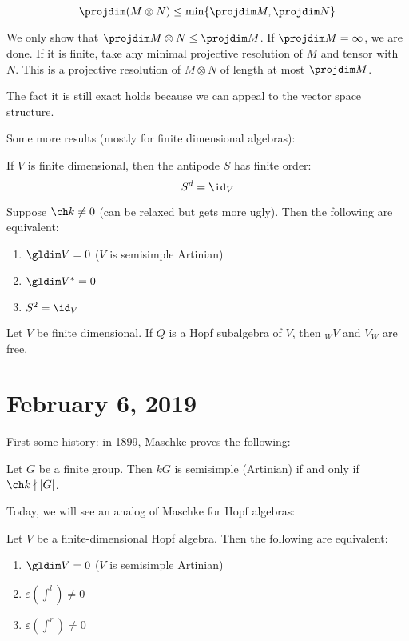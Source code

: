 \documentclass[12pt]{article}
\begin{document}
\begin{lem}\label{lem-tensorproj}
	\[\projdim(M\otimes N)\le \min\{\projdim M,\projdim N\}\]
\end{lem}
\begin{prf}
	We only show that $\projdim M\otimes N\le \projdim M$. If $\projdim M=\infty$, we are done.
	If it is finite, take any minimal projective resolution of $M$ and tensor with $N$. This is a projective 
	resolution of $M\otimes N$ of length at most $\projdim M$. 
\end{prf}
\begin{rmk}
	The fact it is still exact holds because we can appeal to the vector space structure.
\end{rmk}

\brk

Some more results (mostly for finite dimensional algebras):
\begin{thm}[Radford `75]
	If $V$ is finite dimensional, then the antipode $S$ has finite order:
	\[S^d=\id_V\]
\end{thm}
\begin{thm}\label{thm-LR88}
	Suppose $\ch k\ne 0$ (can be relaxed but gets more ugly). Then the following are equivalent:
	\begin{enumerate}
		\item $\gldim V=0$ ($V$ is semisimple Artinian)
		\item $\gldim V^*=0$
		\item $S^2=\id_V$
	\end{enumerate}
\end{thm}
\begin{thm}
	Let $V$ be finite dimensional. If $Q$ is a Hopf subalgebra of $V$, then $_WV$ and $V_W$ are free.
\end{thm}

\section{February 6, 2019}
First some history: in 1899, Maschke proves the following:
\begin{thm}
	Let $G$ be a finite group. Then $kG$ is semisimple (Artinian) if and only if $\ch k\nmid |G|$.
\end{thm}
Today, we will see an analog of Maschke for Hopf algebras:
\begin{thm}
	Let $V$ be a finite-dimensional Hopf algebra. Then the following are equivalent:
	\begin{enumerate}
		\item $\gldim V = 0$ ($V$ is semisimple Artinian)
		\item $\varepsilon(\int^l)\ne 0$
		\item $\varepsilon(\int^r)\ne 0$
	\end{enumerate}
\end{thm}
\end{document}
